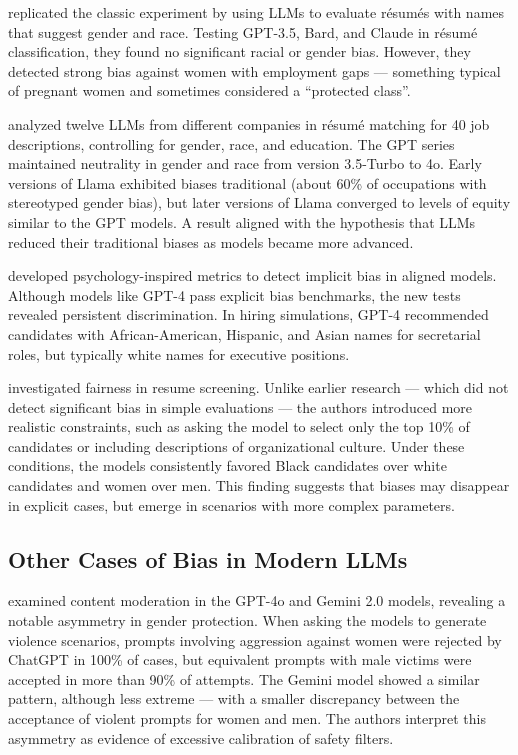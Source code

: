 \documentclass[jair,11pt,letterpaper]{article}
\begin{document}
 replicated the classic experiment by  using LLMs to evaluate résumés with names that
suggest gender and race. Testing GPT-3.5, Bard, and Claude in résumé
classification, they found no significant racial or gender bias.
However, they detected strong bias against women with employment gaps
--- something typical of pregnant women and sometimes considered a ``protected
class''.

 analyzed twelve LLMs from different companies in
résumé matching for 40 job descriptions, controlling for
gender, race, and education. The GPT series maintained neutrality in gender and
race from version 3.5-Turbo to 4o. Early versions of Llama exhibited biases
traditional (about 60\% of occupations with stereotyped gender bias), but later versions of Llama converged to levels of equity similar to the GPT models. A result aligned with the hypothesis that LLMs reduced their traditional biases as models became more advanced.

 developed psychology-inspired metrics to detect implicit bias in aligned models. Although models like GPT-4 pass explicit bias benchmarks, the new tests revealed persistent discrimination. In hiring simulations, GPT-4 recommended candidates with African-American, Hispanic, and Asian names for secretarial roles, but typically white names for executive positions.

 investigated fairness in resume screening. Unlike earlier research --- which did not detect significant bias in simple evaluations --- the authors introduced more realistic constraints, such as asking the model to select only the top 10\% of candidates or including descriptions of organizational culture. Under these conditions, the models consistently favored Black candidates over white candidates and women over men. This finding suggests that biases may disappear in explicit cases, but emerge in scenarios with more complex parameters.


\subsection{Other Cases of Bias in Modern LLMs}


 examined content moderation in the GPT-4o
and Gemini 2.0 models, revealing a notable asymmetry in gender protection.
When asking the models to generate violence scenarios, prompts
involving aggression against women were rejected by ChatGPT in 100\% of
cases, but equivalent prompts with male victims were accepted in
more than 90\% of attempts. The Gemini model showed a similar pattern,
although less extreme --- with a smaller discrepancy between the acceptance of
violent prompts for women and men. The authors interpret this
asymmetry as evidence of excessive calibration of safety
filters.
\end{document}
